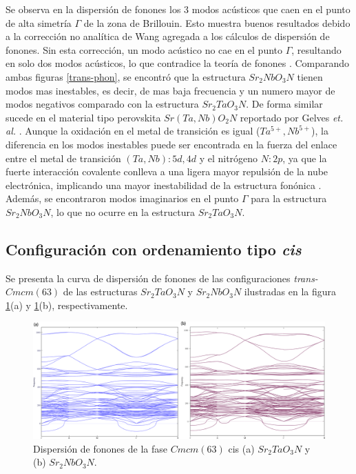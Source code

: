 Se observa en la dispersión de fonones los 3 modos acústicos que caen en el punto de alta simetría $\Gamma$ de la zona de Brillouin. Esto muestra buenos resultados debido a la corrección no analítica de Wang \cite{Wang_2010-nac} agregada a los cálculos de dispersión de fonones. Sin esta corrección, un modo acústico no cae en el punto $\Gamma$, resultando en solo dos modos acústicos, lo que contradice la teoría de fonones \cite{kaxirasjoannopoulos2019}. Comparando ambas figuras \ref{trans-phon}, se encontró que la estructura $Sr_{2}NbO_{3}N$ tienen modos mas inestables, es decir, de mas baja frecuencia y un numero mayor de modos negativos comparado con la estructura $Sr_{2}TaO_{3}N$. De forma similar sucede en el material tipo perovskita $Sr(Ta,Nb)O_{2}N$ reportado por Gelves \textit{et. al.} \cite{Gelves2021oxynitrides}. Aunque la oxidación en el metal de transición es igual ($Ta^{5+},Nb^{5+}$), la diferencia en los modos inestables puede ser encontrada en la fuerza del enlace entre el metal de transición $(Ta,Nb):5d,4d$ y el nitrógeno $N:2p$, ya que la fuerte interacción covalente conlleva a una ligera mayor repulsión de la nube electrónica, implicando  una mayor inestabilidad de la estructura fonónica \cite{Postnikov1993calculations}. Además, se encontraron modos imaginarios en el punto $\Gamma$ para la estructura $Sr_{2}NbO_{3}N$, lo que no ocurre en la estructura $Sr_{2}TaO_{3}N$.


\subsection{Configuración con ordenamiento tipo \emph{cis}}


Se presenta la curva de dispersión de fonones de las configuraciones \emph{trans-}$Cmcm(63)$ de las estructuras $Sr_{2}TaO_{3}N$ y $Sr_{2}NbO_{3}N$ ilustradas en la figura \ref{cis-phon}(a) y \ref{cis-phon}(b), respectivamente.

\begin{figure}[h!]
    \centering
    \includegraphics[width=\textwidth]{Figs/dphon-both_cis.png}
    \caption{Dispersión de fonones de la fase $Cmcm(63)$ cis (a) $Sr_{2}TaO_{3}N$ y (b) $Sr_{2}NbO_{3}N$.}
    \label{cis-phon}
\end{figure}

